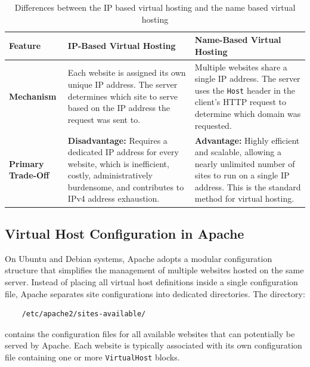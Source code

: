 \documentclass{scrbook}
\begin{document}
	\begin{table}[!h]
	    \centering
	    \begin{tabularx}{\linewidth}{|p{3.5cm}|X|X|}
	        \hline
	        
	        \textbf{Feature} & \textbf{IP-Based Virtual Hosting} & \textbf{Name-Based Virtual Hosting}\\
	        \hline
	        
	        \textbf{Mechanism} &
	        Each website is assigned its own unique IP address. The server determines which site to serve based on the IP address the request was sent to. &
	        Multiple websites share a single IP address. The server uses the \texttt{Host} header in the client's HTTP request to determine which domain was requested.\\
	        \hline
	        
	        \textbf{Primary Trade-Off} &
	        \textbf{Disadvantage:} Requires a dedicated IP address for every website, which is inefficient, costly, administratively burdensome, and contributes to IPv4 address exhaustion. &
	        \textbf{Advantage:} Highly efficient and scalable, allowing a nearly unlimited number of sites to run on a single IP address. This is the standard method for virtual hosting.\\
	        \hline
	    \end{tabularx}
	    \caption{Differences between the IP based virtual hosting and the name based virtual hosting}
	    \label{tbl:virtual_hosting}
	\end{table}
	
	\subsection{Virtual Host Configuration in Apache}
	
	On Ubuntu and Debian systems, Apache adopts a modular configuration structure that simplifies the management of multiple websites hosted on the same server. Instead of placing all virtual host definitions inside a single configuration file, Apache separates site configurations into dedicated directories. The directory:
	
	\begin{lstlisting}
	/etc/apache2/sites-available/
	\end{lstlisting}
	
	contains the configuration files for all available websites that can potentially be served by Apache. Each website is typically associated with its own configuration file containing one or more \texttt{VirtualHost} blocks.\\
	
\end{document}
